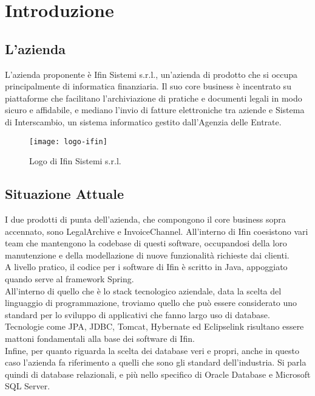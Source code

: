 
\chapter{Introduzione}
\label{cap:introduzione}

\section{L'azienda}

L'azienda proponente è Ifin Sistemi s.r.l., un'azienda di prodotto che si occupa principalmente di informatica finanziaria.
Il suo core business è incentrato su piattaforme che facilitano l'archiviazione di pratiche e documenti legali in modo sicuro e affidabile, e mediano l'invio di fatture elettroniche tra aziende e Sistema di Interscambio, un sistema informatico gestito dall'Agenzia delle Entrate.

\vspace{15pt}
\begin{figure}[htbp]
\begin{center}
\texttt{[image: logo-ifin]}
\caption{Logo di Ifin Sistemi s.r.l.}
\end{center}
\end{figure}
\vspace{15pt}

\section{Situazione Attuale}

I due prodotti di punta dell'azienda, che compongono il core business sopra accennato, sono LegalArchive e InvoiceChannel. All'interno di Ifin coesistono vari team che mantengono la codebase di questi software, occupandosi della loro manutenzione e della modellazione di nuove funzionalità richieste dai clienti.\\
A livello pratico, il codice per i software di Ifin è scritto in Java, appoggiato quando serve al framework Spring.\\
All'interno di quello che è lo stack tecnologico aziendale, data la scelta del linguaggio di programmazione, troviamo quello che può essere considerato uno standard per lo sviluppo di applicativi che fanno largo uso di database. Tecnologie come JPA, JDBC, Tomcat, Hybernate ed Eclipselink risultano essere mattoni fondamentali alla base dei software di Ifin.\\
Infine, per quanto riguarda la scelta dei database veri e propri, anche in questo caso l'azienda fa riferimento a quelli che sono gli standard dell'industria. Si parla quindi di database relazionali, e più nello specifico di Oracle Database e Microsoft SQL Server.\\

